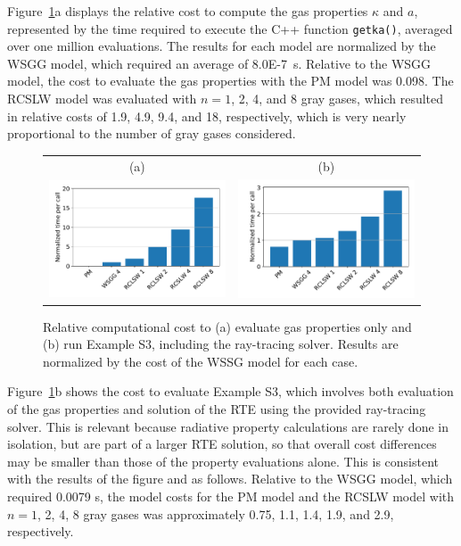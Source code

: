 \documentclass[preprint,12pt]{elsarticle}
\begin{document}
    Figure~\ref{f:cost}a displays the relative cost to compute the gas properties $\kappa$ and $a$, represented by the time required to execute the C++ function \texttt{get\textunderscore k\textunderscore a()}, averaged over one million evaluations. The results for each model are normalized by the WSGG model, which required an average of 8.0E-7~s. Relative to the WSGG model, the cost to evaluate the gas properties with the PM model was 0.098. The RCSLW model was evaluated with $n=1$, 2, 4, and 8 gray gases, which resulted in relative costs of 1.9, 4.9, 9.4, and 18, respectively, which is very nearly proportional to the number of gray gases considered.
%
    \begin{figure}
        \begin{center}
            \begin{tabular}{c c}
            (a)
                & (b) \\
                \includegraphics[width=2.5 in]{fig_getka_c++.pdf} &
                \includegraphics[width=2.5 in]{fig_exS3_c++.pdf}
            \end{tabular}
            \caption{Relative computational cost to (a) evaluate gas properties only and (b) run Example S3, including the ray-tracing solver. Results are normalized by the cost of the WSSG model for each case.}
            \label{f:cost}
        \end{center}
    \end{figure}
%

    Figure~\ref{f:cost}b shows the cost to evaluate Example S3, which involves both evaluation of the gas properties and solution of the RTE using the provided ray-tracing solver. This is relevant because radiative property calculations are rarely done in isolation, but are part of a larger RTE solution, so that overall cost differences may be smaller than those of the property evaluations alone. This is consistent with the results of the figure and as follows. Relative to the WSGG model, which required 0.0079 s, the model costs for the PM model and the RCSLW model with $n=1$, 2, 4, 8 gray gases was approximately 0.75, 1.1, 1.4, 1.9, and 2.9, respectively.
\end{document}
